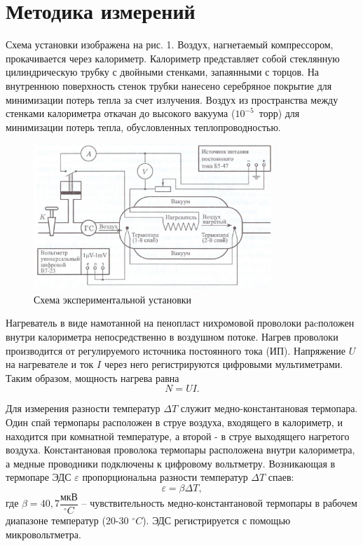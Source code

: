 \documentclass[a4paper, 12pt]{article}
\begin{document}
\section{Методика измерений}

Схема установки изображена на рис. 1. Воздух, нагнетаемый компрессором, прокачивается через калориметр. Калориметр представляет собой стеклянную цилиндрическую трубку с двойными стенками, запаянными с торцов. На внутреннюю поверхность стенок трубки нанесено серебряное покрытие для минимизации потерь тепла за счет излучения. Воздух из пространства между стенками калориметра откачан до высокого вакуума ($10^{-5}$~торр) для минимизации потерь тепла, обусловленных теплопроводностью.

\begin{figure}[h!]
\begin{center}
\includegraphics[width = 0.8\textwidth]{2.jpg}
\caption{Схема экспериментальной установки}
\label{ris2}
\end{center}
\end{figure}

Нагреватель в виде намотанной на пенопласт нихромовой проволоки раcположен внутри калориметра непосредственно в воздушном потоке. Нагрев проволоки производится от регулируемого источника постоянного тока (ИП). Напряжение $U$ на нагревателе и ток $I$ через него регистрируются цифровыми мультиметрами. Таким образом, мощность нагрева равна
\begin{equation}\label{3}
N = UI.
\end{equation}

Для измерения разности температур $\Delta T$ служит медно-константановая термопара. Один спай термопары расположен в струе воздуха, входящего в калориметр, и находится при комнатной температуре, а второй - в струе выходящего нагретого воздуха. Константановая проволока термопары расположена внутри калориметра, а медные проводники подключены к цифровому вольтметру. Возникающая в термопаре ЭДС $\varepsilon$ пропорциональна разности температур $\Delta T$ спаев:
\begin{equation}\label{4}
\varepsilon = \beta \Delta T,
\end{equation}
где $\beta = 40,7 \dfrac{\text{мкВ}}{ ^{\circ} C}$ -- чувствительность медно-константановой термопары в рабочем диапазоне температур (20-30 $ ^{\circ} C$). ЭДС регистрируется с помощью микровольтметра.
\end{document}
